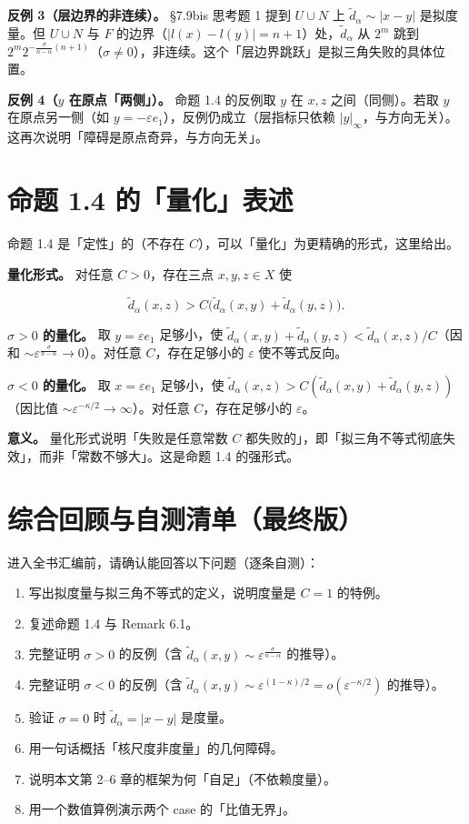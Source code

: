 \documentclass[a4paper,11pt,openany]{ctexbook}
\numberwithin{equation}{chapter}
\numberwithin{figure}{chapter}
\numberwithin{table}{chapter}
\begin{document}
\textbf{反例 3（层边界的非连续）。} §7.9bis 思考题 1 提到 $U\cup N$ 上 $\widetilde d_\alpha\sim|x-y|$ 是拟度量。但 $U\cup N$ 与 $F$ 的边界（$|l(x)-l(y)|=n+1$）处，$\widetilde d_\alpha$ 从 $2^m$ 跳到 $2^m2^{-\frac{\sigma}{n-\alpha}(n+1)}$（$\sigma\neq0$），非连续。这个「层边界跳跃」是拟三角失败的具体位置。

\textbf{反例 4（$y$ 在原点「两侧」）。} 命题 1.4 的反例取 $y$ 在 $x,z$ 之间（同侧）。若取 $y$ 在原点另一侧（如 $y=-\varepsilon e_1$），反例仍成立（层指标只依赖 $|y|_\infty$，与方向无关）。这再次说明「障碍是原点奇异，与方向无关」。

\section{命题 1.4 的「量化」表述}

命题 1.4 是「定性」的（不存在 $C$），可以「量化」为更精确的形式，这里给出。

\textbf{量化形式。} 对任意 $C>0$，存在三点 $x,y,z\in X$ 使

$$\widetilde d_\alpha(x,z)>C\bigl(\widetilde d_\alpha(x,y)+\widetilde d_\alpha(y,z)\bigr).$$

\textbf{$\sigma>0$ 的量化。} 取 $y=\varepsilon e_1$ 足够小，使 $\widetilde d_\alpha(x,y)+\widetilde d_\alpha(y,z)<\widetilde d_\alpha(x,z)/C$（因和 $\sim\varepsilon^{\frac{\sigma}{n-\alpha}}\to0$）。对任意 $C$，存在足够小的 $\varepsilon$ 使不等式反向。

\textbf{$\sigma<0$ 的量化。} 取 $x=\varepsilon e_1$ 足够小，使 $\widetilde d_\alpha(x,z)>C(\widetilde d_\alpha(x,y)+\widetilde d_\alpha(y,z))$（因比值 $\sim\varepsilon^{-\kappa/2}\to\infty$）。对任意 $C$，存在足够小的 $\varepsilon$。

\textbf{意义。} 量化形式说明「失败是任意常数 $C$ 都失败的」，即「拟三角不等式彻底失效」，而非「常数不够大」。这是命题 1.4 的强形式。

\section{综合回顾与自测清单（最终版）}

进入全书汇编前，请确认能回答以下问题（逐条自测）：

\begin{enumerate}
\item 写出拟度量与拟三角不等式的定义，说明度量是 $C=1$ 的特例。
\item 复述命题 1.4 与 Remark 6.1。
\item 完整证明 $\sigma>0$ 的反例（含 $\widetilde d_\alpha(x,y)\sim\varepsilon^{\frac{\sigma}{n-\alpha}}$ 的推导）。
\item 完整证明 $\sigma<0$ 的反例（含 $\widetilde d_\alpha(x,y)\sim\varepsilon^{(1-\kappa)/2}=o(\varepsilon^{-\kappa/2})$ 的推导）。
\item 验证 $\sigma=0$ 时 $\widetilde d_\alpha=|x-y|$ 是度量。
\item 用一句话概括「核尺度非度量」的几何障碍。
\item 说明本文第 2–6 章的框架为何「自足」（不依赖度量）。
\item 用一个数值算例演示两个 case 的「比值无界」。
\end{enumerate}
\end{document}
